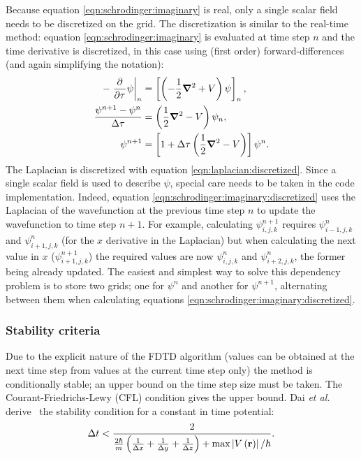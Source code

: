 Because equation \eqref{eqn:schrodinger:imaginary} is real, only a single scalar
field needs to be discretized on the grid. The discretization is similar to the
real-time method: equation \eqref{eqn:schrodinger:imaginary} is evaluated at
time step $n$ and the time derivative is discretized, in this case using (first
order) forward-differences (and again simplifying the notation):
\begin{align}
- \left. \frac{\partial^{{}} }{\partial {\tau}^{{}}} \psi \right|_{n}
    & = \left[  \left( -\frac{1}{2} \bm{\nabla}^2 + V \right) \psi  \right]_{n},
\\
\frac{\psi^{n+1} - \psi^{n}}{\Delta \tau}
    & = \left( \frac{1}{2} \bm{\nabla}^2 - V \right) \psi_{n},
\\
\psi^{n+1} & = \left[ 1 + \Delta \tau \left( \frac{1}{2} \bm{\nabla}^2 - V \right) \right] \psi^{n}.
\label{eqn:schrodinger:imaginary:discretized}
\end{align}
The Laplacian is discretized with equation \eqref{eqn:laplacian:discretized}.
Since a single scalar field is used to describe $\psi$, special care needs to
be taken in the code implementation. Indeed, equation
\eqref{eqn:schrodinger:imaginary:discretized} uses the Laplacian of the
wavefunction at the previous time step $n$ to update the wavefunction to
time step $n+1$. For example, calculating $\psi^{n+1}_{i,j,k}$ requires
$\psi^{n}_{i-1,j,k}$ and $\psi^{n}_{i+1,j,k}$ (for the $x$ derivative in the
Laplacian) but when calculating the next value in $x$ ($\psi^{n+1}_{i+1,j,k}$)
the required values are now $\psi^{n}_{i,j,k}$ and $\psi^{n}_{i+2,j,k}$, the
former being already updated. The easiest and simplest way to solve this
dependency problem is to store two grids; one for $\psi^{n}$ and another for
$\psi^{n+1}$, alternating between them when calculating equations
\eqref{eqn:schrodinger:imaginary:discretized}.


\subsubsection{Stability criteria}

Due to the explicit nature of the FDTD algorithm (values can be obtained at the
next time step from values at the current time step only) the method is
conditionally stable; an upper bound on the time step size must be taken. The
Courant-Friedrichs-Lewy (CFL) condition gives the upper bound. Dai \textit{et
al.} derive~\cite{Dai2005} the stability condition for a constant in time
potential:
\begin{align}
\Delta t < \frac{2}{
    \frac{2 \hbar}{m} \left( 
         \frac{1}{\Delta x}
        +\frac{1}{\Delta y}
        +\frac{1}{\Delta z}
         \right)
        + \textrm{max}\left| V\left( \textbf{r} \right) \right| / \hbar
    }.
\end{align}



